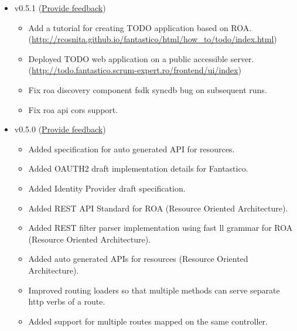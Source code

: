 \documentclass[letterpaper,10pt,english]{sphinxmanual}
\begin{document}
\begin{itemize}
\item {} 
v0.5.1 (\href{https://docs.google.com/forms/d/1tKBopU3lfDB\_w8F4h7Rl1Rn4uydAJq-nha09L\_ptJck/edit?usp=sharing}{Provide feedback})
\begin{itemize}
\item {} 
Add a tutorial for creating TODO application based on ROA. (\href{http://rcosnita.github.io/fantastico/html/how\_to/todo/index.html}{http://rcosnita.github.io/fantastico/html/how\_to/todo/index.html})

\item {} 
Deployed TODO web application on a public accessible server. (\href{http://todo.fantastico.scrum-expert.ro/frontend/ui/index}{http://todo.fantastico.scrum-expert.ro/frontend/ui/index})

\item {} 
Fix roa discovery component fsdk syncdb bug on subsequent runs.

\item {} 
Fix roa api cors support.

\end{itemize}

\item {} 
v0.5.0 (\href{https://docs.google.com/forms/d/1tKBopU3lfDB\_w8F4h7Rl1Rn4uydAJq-nha09L\_ptJck/edit?usp=sharing}{Provide feedback})
\begin{itemize}
\item {} 
Added specification for auto generated API for resources.

\item {} 
Added OAUTH2 draft implementation details for Fantastico.

\item {} 
Added Identity Provider draft specification.

\item {} 
Added REST API Standard for ROA (Resource Oriented Architecture).

\item {} 
Added REST filter parser implementation using fast ll grammar for ROA (Resource Oriented Architecture).

\item {} 
Added auto generated APIs for resources (Resource Oriented Architecture).

\item {} 
Improved routing loaders so that multiple methods can serve separate http verbs of a route.

\item {} 
Added support for multiple routes mapped on the same controller.


\end{itemize}
\end{itemize}
\end{document}
